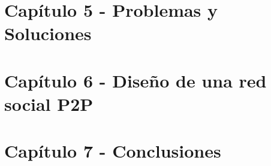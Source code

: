 \documentclass[letter, 12pt]{report}
\begin{document}
%

\section*{Capítulo 5 - Problemas y Soluciones}
\label{sec:problemasysoluciones}


\section*{Capítulo 6 - Diseño de una red social P2P}
\label{sec:implementacion}

%

\section*{Capítulo 7 - Conclusiones}
\label{sec:conclusiones}


\appendix

%
%
\end{document}

